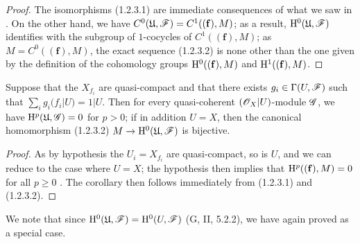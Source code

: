 \begin{proof}
The isomorphisms (1.2.3.1) are immediate consequences of what we saw in .
On the other hand, we have $C^0(\mathfrak{U},\mathscr{F})=C^1((\mathbf{f}),M)$; as a result, $\mathrm{H}^0(\mathfrak{U},\mathscr{F})$ identifies with the subgroup of $1$-cocycles of $C^1((\mathbf{f}),M)$; as $M=C^0((\mathbf{f}),M)$, the exact sequence (1.2.3.2) is none other than the one given by the definition of the cohomology groups $\mathrm{H}^0((\mathbf{f}),M)$ and $\mathrm{H}^1((\mathbf{f}),M)$.
\end{proof}

\begin{corollary}[1.2.4]
\label{III.1.2.4}
Suppose that the $X_{f_i}$ are quasi-compact and that there exists $g_i\in\Gamma(U,\mathscr{F})$ such that $\sum_i g_i(f_i|U)=1|U$.
Then for every quasi-coherent $(\mathscr{O}_X|U)$-module $\mathscr{G}$, we have $\mathrm{H}^p(\mathfrak{U},\mathscr{G})=0$ for $p>0$; if in addition $U=X$, then the canonical homomorphism (1.2.3.2) $M\to\HH^0(\mathfrak{U},\sh{F})$ is bijective.
\end{corollary}

\begin{proof}
As by hypothesis the $U_i=X_{f_i}$ are quasi-compact, so is $U$, and we can reduce to the case where $U=X$; the hypothesis then implies that $\mathrm{H}^p((\mathbf{f}),M)=0$ for all $p\geq 0$ .
The corollary then follows immediately from (1.2.3.1) and (1.2.3.2).
\end{proof}

We note that since $\mathrm{H}^0(\mathfrak{U},\mathscr{F})=\mathrm{H}^0(U,\mathscr{F})$ (G, II, 5.2.2), we have again proved  as a special case.

